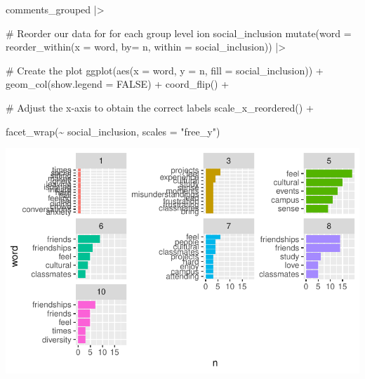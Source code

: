 \documentclass[
  letterpaper,
]{krantz}
\makeatletter
\newenvironment{Shaded}{\begin{snugshade}}{\end{snugshade}}
\newcommand{\AttributeTok}[1]{\textcolor[rgb]{0.40,0.45,0.13}{#1}}
\newcommand{\CommentTok}[1]{\textcolor[rgb]{0.37,0.37,0.37}{#1}}
\newcommand{\ConstantTok}[1]{\textcolor[rgb]{0.56,0.35,0.01}{#1}}
\newcommand{\FunctionTok}[1]{\textcolor[rgb]{0.28,0.35,0.67}{#1}}
\newcommand{\NormalTok}[1]{\textcolor[rgb]{0.00,0.23,0.31}{#1}}
\newcommand{\SpecialCharTok}[1]{\textcolor[rgb]{0.37,0.37,0.37}{#1}}
\newcommand{\StringTok}[1]{\textcolor[rgb]{0.13,0.47,0.30}{#1}}
\newenvironment{kframe}{%
\medskip{}
\setlength{\fboxsep}{.8em}
 \def\at@end@of@kframe{}%
 \ifinner\ifhmode%
  \def\at@end@of@kframe{\end{minipage}}%
  \begin{minipage}{\columnwidth}%
 \fi\fi%
 \def\FrameCommand##1{\hskip\@totalleftmargin \hskip-\fboxsep
 \colorbox{shadecolor}{##1}\hskip-\fboxsep
     \hskip-\linewidth \hskip-\@totalleftmargin \hskip\columnwidth}%
 \MakeFramed {\advance\hsize-\width
   \@totalleftmargin\z@ \linewidth\hsize
   \@setminipage}}%
 {\par\unskip\endMakeFramed%
 \at@end@of@kframe}
\renewenvironment{Shaded}{\begin{kframe}}{\end{kframe}}
\makeatother
\begin{document}
\begin{Shaded}
\begin{Highlighting}[]
\NormalTok{comments\_grouped }\SpecialCharTok{|\textgreater{}}
  
  \CommentTok{\# Reorder our data for for each group level ion social\_inclusion}
  \FunctionTok{mutate}\NormalTok{(}\AttributeTok{word =} \FunctionTok{reorder\_within}\NormalTok{(}\AttributeTok{x =}\NormalTok{ word,}
                               \AttributeTok{by=}\NormalTok{ n,}
                               \AttributeTok{within =}\NormalTok{ social\_inclusion)) }\SpecialCharTok{|\textgreater{}}

 \CommentTok{\# Create the plot}
    \FunctionTok{ggplot}\NormalTok{(}\FunctionTok{aes}\NormalTok{(}\AttributeTok{x =}\NormalTok{ word,}
               \AttributeTok{y =}\NormalTok{ n,}
               \AttributeTok{fill =}\NormalTok{ social\_inclusion)) }\SpecialCharTok{+}
  \FunctionTok{geom\_col}\NormalTok{(}\AttributeTok{show.legend =} \ConstantTok{FALSE}\NormalTok{) }\SpecialCharTok{+}
  \FunctionTok{coord\_flip}\NormalTok{() }\SpecialCharTok{+}

  \CommentTok{\# Adjust the x{-}axis to obtain the correct labels    }
  \FunctionTok{scale\_x\_reordered}\NormalTok{() }\SpecialCharTok{+}
      
  \FunctionTok{facet\_wrap}\NormalTok{(}\SpecialCharTok{\textasciitilde{}}\NormalTok{ social\_inclusion,}
             \AttributeTok{scales =} \StringTok{"free\_y"}\NormalTok{)}
\end{Highlighting}
\end{Shaded}

\includegraphics{14_mixed_methods_files/figure-pdf/visualise-social-inclusion-groups-words-n-04-1.pdf}
\end{document}
